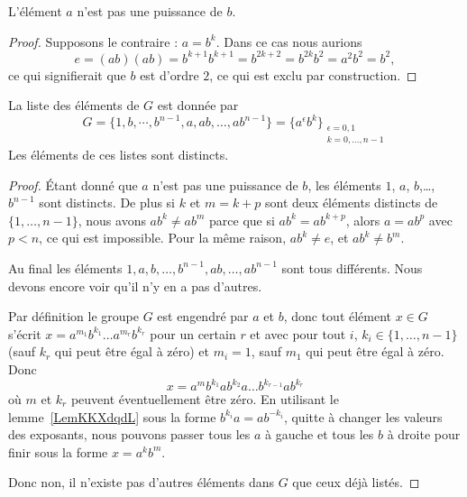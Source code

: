 \begin{proposition}     \label{PROPooVQARooWuKHMZ}
	L'élément \( a\) n'est pas une puissance de \( b\).
\end{proposition}

\begin{proof}
	Supposons le contraire : \( a=b^k\). Dans ce cas nous aurions
	\begin{equation}
		e=(ab)(ab)=b^{k+1}b^{k+1}=b^{2k+2}=b^{2k}b^2=a^2b^2=b^2,
	\end{equation}
	ce qui signifierait que \( b\) est d'ordre \( 2\), ce qui est exclu par construction.
\end{proof}

\begin{proposition}      \label{PROPooEPVGooQjHRJp}
	La liste des éléments de \( G\) est donnée par
	\begin{equation}
		G=\{ 1,b,\cdots,b^{n-1},a,ab,\ldots, ab^{n-1} \}=\{ a^{\epsilon}b^k\}_{\substack{\epsilon=0,1\\k=0,\ldots, n-1}}
	\end{equation}
	Les éléments de ces listes sont distincts.
\end{proposition}

\begin{proof}
	Étant donné que \( a\) n'est pas une puissance de \( b\), les éléments \( 1\), \( a\), \( b\),\ldots, \( b^{n-1}\) sont distincts. De plus si \( k\) et \( m=k+p\) sont deux éléments distincts de \( \{ 1,\ldots, n-1 \}\), nous avons \( ab^k\neq ab^m\) parce que si \( ab^k=ab^{k+p}\), alors \( a=ab^p\) avec \( p<n\), ce qui est impossible. Pour la même raison, \( ab^k\neq e\), et \( ab^k\neq b^m\).

	Au final les éléments \( 1,a,b,\ldots, b^{n-1},ab,\ldots, ab^{n-1}\) sont tous différents. Nous devons encore voir qu'il n'y en a pas d'autres.

	Par définition le groupe \( G\) est engendré par \( a\) et \( b\), donc tout élément \( x\in G\) s'écrit \( x=a^{m_1}b^{k_1}\ldots a^{m_r}b^{k_r}\) pour un certain \( r\) et avec pour tout \( i\), \( k_i\in\{ 1,\ldots, n-1 \}\) (sauf \( k_r\) qui peut être égal à zéro) et \( m_i=1\), sauf \( m_1\) qui peut être égal à zéro. Donc
	\begin{equation}
		x=a^mb^{k_1}ab^{k_2}a\ldots b^{k_{r-1}}ab^{k_r}
	\end{equation}
	où \( m\) et \( k_r\) peuvent éventuellement être zéro. En utilisant le lemme~\ref{LemKKXdqdL} sous la forme \( b^{k_i}a=ab^{-k_i}\), quitte à changer les valeurs des exposants, nous pouvons passer tous les \( a \) à gauche et tous les \( b\) à droite pour finir sous la forme \( x=a^kb^m\).

	Donc non, il n'existe pas d'autres éléments dans \( G\) que ceux déjà listés.
\end{proof}

